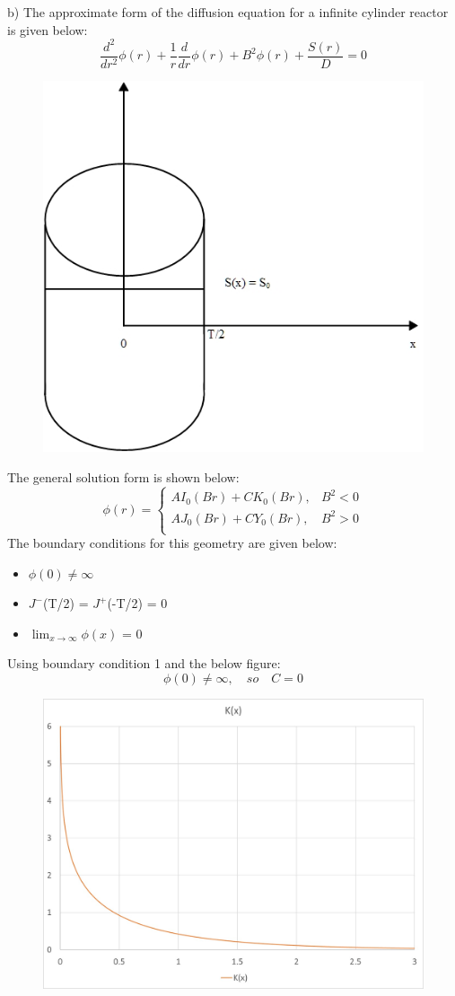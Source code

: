 \documentclass{amsart}
\theoremstyle{definition}
\begin{document}
\newpage
\bigbreak
b) The approximate form of the diffusion equation for a infinite cylinder reactor is given below:
\bigbreak
\begin{equation*}
    \frac{d^2}{dr^2}\phi(r) + \frac{1}{r}\frac{d}{dr}\phi(r) +B^2\phi(r) + \frac{S(r)}{D} = 0
\end{equation*}
\begin{figure}[h!]
                \includegraphics[width=.45\linewidth]{P1b.jpg}
\end{figure}
\bigbreak
The general solution form is shown below:
\bigbreak
\[   \phi(r) = \left\{
\begin{array}{ll}
      AI_0(Br) + CK_0(Br), &  B^2 < 0\\
      AJ_0(Br) + CY_0(Br), &  B^2 > 0\\
\end{array}
\right. \]
\bigbreak
The boundary conditions for this geometry are given below:
\begin{itemize}
    \item $\phi(0) \neq \infty$
    \item $J^-$(T/2) = $J^+$(-T/2) = 0
    \item $\lim_{x\to\infty} \phi(x)$ = 0
\end{itemize}
\newpage
Using boundary condition 1 and the below figure:
\begin{equation*}
    \phi(0) \neq \infty, \quad so \quad C = 0
\end{equation*}
\begin{figure}[h!]
                \includegraphics[width=.8\linewidth]{K_bessel.jpg}
\end{figure}
\end{document}
